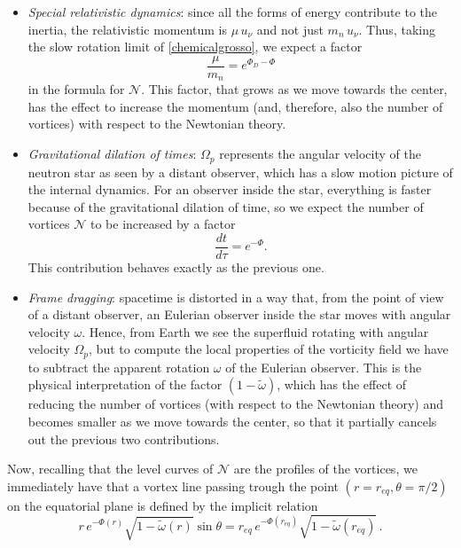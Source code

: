 \documentclass[usenatbib%
]{mnras}
\begin{document}
\begin{itemize}

\item \textit{Special relativistic dynamics}: since all the forms of energy contribute to the inertia, the relativistic momentum is $\mu \, u_\nu$ and not just $m_n \, u_\nu$. 
Thus, taking the slow rotation limit of \eqref{chemicalgrosso}, we expect a factor
\begin{equation}
\dfrac{\mu}{m_n} = e^{\Phi_D - \Phi}
\end{equation}
in the formula for $\mathcal{N}$. This factor, that grows as we move towards the center, has the effect to increase the momentum  (and, therefore, also the number of vortices) with respect to the Newtonian theory.

\item \textit{Gravitational dilation of times}: $\Omega_p$ represents the angular velocity of the neutron star as seen by a distant observer, which has a slow motion picture  of the internal dynamics. For an observer inside the star, everything is faster because of the gravitational dilation of time, so we expect the number of vortices $\mathcal{N}$ to be increased by a factor
\begin{equation}
\dfrac{dt}{d\tau} = e^{-\Phi}.
\end{equation}
This contribution behaves exactly as the previous one.

\item \textit{Frame dragging}: spacetime is distorted in a way that, from the point of view of a distant observer,  an Eulerian observer inside the star moves with angular velocity $\omega$. Hence, from Earth we see the superfluid rotating with angular velocity $\Omega_p$, but to compute the local properties of the vorticity field we have to subtract the apparent rotation $\omega$ of the Eulerian observer. This is the physical interpretation of the factor $( 1-\tilde{\omega})$, which has the effect of reducing the number of vortices (with respect to the Newtonian theory) and becomes smaller as we move towards the center, so that it partially cancels out the previous two contributions.
%
\end{itemize}
%
Now, recalling that the level curves of $\mathcal{N}$ are the profiles of the vortices, we immediately have that a vortex line passing trough the point $(r=r_{eq} , \theta=\pi/2)$ on the equatorial plane is defined by the implicit relation
\begin{equation}
r \, e^{-\Phi(r)} \sqrt{1 - \tilde{\omega}(r)}  \sin \theta 
= 
r_{eq} \, e^{-\Phi(r_{eq})} \sqrt{1 - \tilde{\omega}(r_{eq})} \, .
\end{equation}
\end{document}
